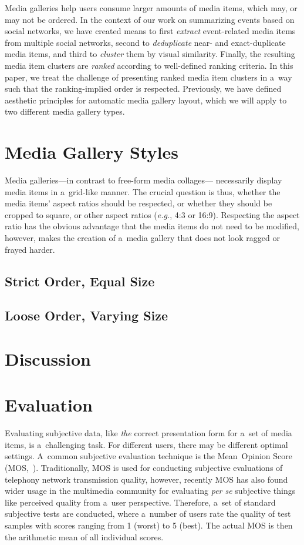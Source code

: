 \documentclass{sig-alternate}
\begin{document}
Media galleries help users consume larger amounts of media items,
which may, or may not be ordered.
In the context of our work on summarizing events
based on social networks, we have created means
to first \emph{extract} event-related media items
from multiple social networks, second to
\emph{deduplicate} near- and exact-duplicate media items,
and third to \emph{cluster} them by visual similarity.
Finally, the resulting media item clusters are \emph{ranked}
according to well-defined ranking criteria.
In this paper, we treat the challenge of presenting
ranked media item clusters in a~way
such that the ranking-implied order is respected.
Previously, we have defined~\cite{steiner2012definingaesthetic}
aesthetic principles for automatic media gallery layout,
which we will apply to two different media gallery types.

\section{Media Gallery Styles}

Media galleries---in contrast to free-form media collages---%
necessarily display media items in a~grid-like manner.
The crucial question is thus, whether the media items' aspect ratios
should be respected, or whether they should be cropped to square,
or other aspect ratios (\emph{e.g.}, 4:3 or 16:9).
Respecting the aspect ratio has the obvious advantage that the media items
do not need to be modified, however, makes the creation of a~media gallery
that does not look ragged or frayed harder.

\subsection{Strict Order, Equal Size}

\subsection{Loose Order, Varying Size}

\section{Discussion}

\section{Evaluation}

Evaluating subjective data, like \emph{the} correct presentation form
for a~set of media items, is a~challenging task.
For different users, there may be different optimal settings.
A~common subjective evaluation technique
is the Mean~Opinion Score (MOS,~\cite{itu1998mos}).
Traditionally, MOS is used for conducting subjective evaluations
of telephony network transmission quality,
however, recently MOS has also found
wider usage in the multimedia community
for evaluating \emph{per se} subjective things
like perceived quality from a~user perspective. 
Therefore, a~set of standard subjective tests are conducted,
where a~number of users rate the quality of test samples
with scores ranging from 1 (worst) to 5 (best).
The actual MOS is then the arithmetic mean of all individual scores.
\end{document}
